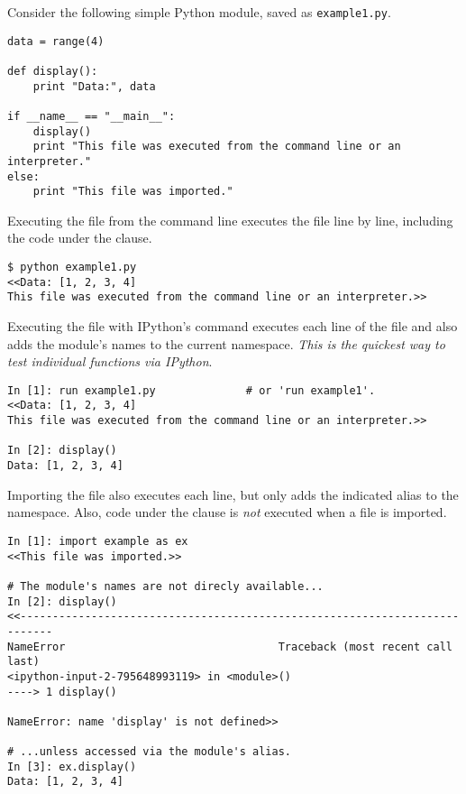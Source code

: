 Consider the following simple Python module, saved as \texttt{example1.py}.

\begin{lstlisting}
data = range(4)

def display():
    print "Data:", data

if __name__ == "__main__":
    display()
    print "This file was executed from the command line or an interpreter."
else:
    print "This file was imported."
\end{lstlisting}

Executing the file from the command line executes the file line by line, including the code under the  clause.

\begin{lstlisting}
$ python example1.py
<<Data: [1, 2, 3, 4]
This file was executed from the command line or an interpreter.>>
\end{lstlisting}

Executing the file with IPython's  command executes each line of the file and also adds the module's names to the current namespace.
\emph{This is the quickest way to test individual functions via IPython}.

\begin{lstlisting}
In [1]: run example1.py              # or 'run example1'.
<<Data: [1, 2, 3, 4]
This file was executed from the command line or an interpreter.>>

In [2]: display()
Data: [1, 2, 3, 4]
\end{lstlisting}

Importing the file also executes each line, but only adds the indicated alias to the namespace.
Also, code under the  clause is \emph{not} executed when a file is imported.

\begin{lstlisting}
In [1]: import example as ex
<<This file was imported.>>

# The module's names are not direcly available...
In [2]: display()
<<---------------------------------------------------------------------------
NameError                                 Traceback (most recent call last)
<ipython-input-2-795648993119> in <module>()
----> 1 display()

NameError: name 'display' is not defined>>

# ...unless accessed via the module's alias.
In [3]: ex.display()
Data: [1, 2, 3, 4]
\end{lstlisting}

